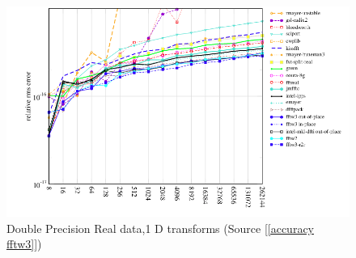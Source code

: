 \begin{figure}[H]
\centering
\includegraphics[scale=0.45]{figures/doublefftw.png}
\caption{Double Precision Real data,1 D transforms (Source [\ref{accuracy fftw3}])}
\label{fig:doublea}
\end{figure}